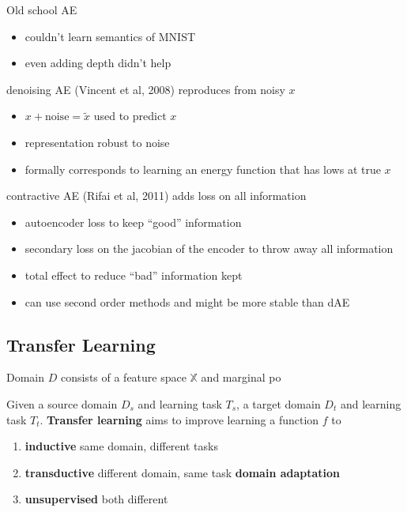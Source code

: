 \documentclass[]{article}
\theoremstyle{definition}
\begin{document}
    Old school AE
    \begin{itemize}
        \item couldn't learn semantics of MNIST
        \item even adding depth didn't help
    \end{itemize}

    denoising AE (Vincent et al, 2008) reproduces from noisy $x$
    \begin{itemize}
        \item $x + \text{noise} = \tilde x$ used to predict $x$
        \item representation robust to noise
        \item formally corresponds to learning an energy function that has lows at true $x$
    \end{itemize}

    contractive AE (Rifai et al, 2011) adds loss on all information
    \begin{itemize}
        \item autoencoder loss to keep ``good'' information
        \item secondary loss on the jacobian of the encoder to throw away all information
        \item total effect to reduce ``bad'' information kept
        \item can use second order methods and might be more stable than dAE
    \end{itemize}


    \subsection{Transfer Learning}%
    \label{sub:transfer_learning}

    Domain $D$ consists of a feature space $\mathbb{X}$ and marginal po

    Given a source domain $D_s$ and learning task $T_s$, a target domain $D_t$ and learning task $T_t$. \textbf{Transfer learning} aims to improve learning a function $f$ to
    \begin{enumerate}
        \item \textbf{inductive} same domain, different tasks
        \item \textbf{transductive} different domain, same task \textbf{domain adaptation}
        \item \textbf{unsupervised} both different
    \end{enumerate}
\end{document}
